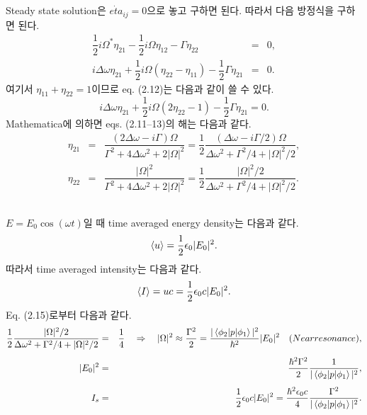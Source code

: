 \documentclass[10pt, a4paper]{article}
\numberwithin{equation}{section}
\begin{document}
    \subsection{}
    Steady state solution은 $\dot{eta}_{ij} = 0$으로 놓고 구하면 된다. 따라서 다음 방정식을 구하면 된다.
    \begin{eqnarray}
        \dfrac{1}{2}i\Omega^* \eta_{21} - \dfrac{1}{2}i\Omega \eta_{12} - \Gamma \eta_{22} &=& 0,\\[1ex]
        i\Delta \omega \eta_{21} + \dfrac{1}{2}i \Omega (\eta_{22} - \eta_{11})- \dfrac{1}{2}\Gamma \eta_{21} &=&0.
    \end{eqnarray}
    여기서 $\eta_{11} + \eta_{22} = 1$이므로 eq. (2.12)는 다음과 같이 쓸 수 있다.
    \begin{equation}
        i\Delta \omega \eta_{21} + \dfrac{1}{2}i \Omega (2\eta_{22}-1)- \dfrac{1}{2}\Gamma \eta_{21} =0.
    \end{equation}
    Mathematica에 의하면 eqs. (2.11--13)의 해는 다음과 같다.
    \begin{eqnarray}
        \eta_{21} &=& \dfrac{(2\Delta\omega - i\Gamma)\Omega}{\Gamma^2 + 4\Delta\omega^2 + 2|\Omega|^2} = \dfrac{1}{2}\dfrac{(\Delta\omega - i\Gamma/2)\Omega}{\Delta\omega^2 + \Gamma^2/4 + |\Omega|^2/2},\\[1ex]
        \eta_{22} &=& \dfrac{|\Omega|^2}{\Gamma^2 + 4\Delta\omega^2 + 2|\Omega|^2} = \dfrac{1}{2}\dfrac{|\Omega|^2/2}{\Delta\omega^2 + \Gamma^2/4 + |\Omega|^2/2}.
    \end{eqnarray}

    \subsection{}
    \subsubsection{}
    $E = E_0 \cos(\omega t)$일 때 time averaged energy density는 다음과 같다.
    \begin{equation}
        \expval{u} = \dfrac{1}{2}\epsilon_0 |E_0|^2.
    \end{equation}
    따라서 time averaged intensity는 다음과 같다.
    \begin{equation}
        \expval{I} = uc = \dfrac{1}{2}\epsilon_0 c |E_0|^2.
    \end{equation}
    Eq. (2.15)로부터 다음과 같다.
    \begin{eqnarray}
        \dfrac{1}{2}\dfrac{|\Omega|^2/2}{\Delta\omega^2 + \Gamma^2/4 + |\Omega|^2/2} &=& \dfrac{1}{4} \quad \Rightarrow \quad |\Omega|^2 \approx \dfrac{\Gamma^2}{2} = \dfrac{|\mel{\phi_2}{p}{\phi_1}|^2}{\hbar^2}|E_0|^2 \quad (Near resonance),\\[1ex]
        |E_0|^2 &=& \dfrac{\hbar^2 \Gamma^2}{2}\dfrac{1}{|\mel{\phi_2}{p}{\phi_1}|^2},\\[1ex]
        I_s &=& \dfrac{1}{2}\epsilon_0 c |E_0|^2 = \dfrac{\hbar^2 \epsilon_0 c}{4}\dfrac{\Gamma^2}{|\mel{\phi_2}{p}{\phi_1}|^2}.
    \end{eqnarray}
\end{document}
